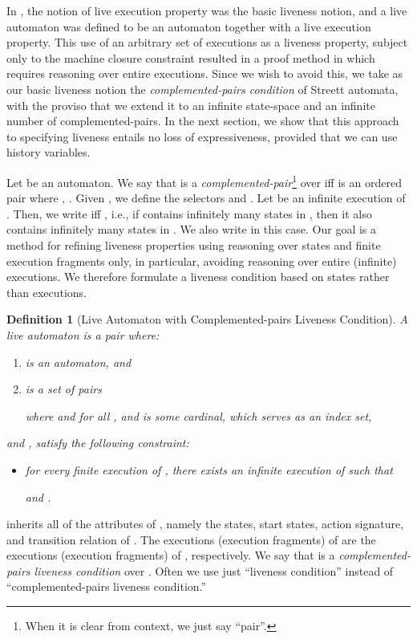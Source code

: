 \documentclass[11pt]{article}
\newcommand{\be}{\begin{itemize}}
\newcommand{\ee}{\end{itemize}}
\newcommand{\bn}{\begin{enumerate}}
\newcommand{\en}{\end{enumerate}}
\newcommand{\bd}{\begin{definition}}
\newcommand{\ed}{\end{definition}}
\newcommand{\intrdef}{\emph}	\newcommand{\intr}{\emph}
\newtheorem{definition}{Definition}
\begin{document}
In \cite{GSSL93,GSSL98}, the notion of live execution property was the
basic liveness notion, and a live automaton was defined to be an
automaton  together with a live execution property.
This use of an arbitrary set of executions as a liveness property,
subject only to the machine closure constraint resulted in a proof
method in \cite{GSSL93} which requires reasoning over entire
executions. Since we wish to avoid this, we take as our basic liveness
notion the \intr{complemented-pairs condition} of Streett automata,
with the proviso that we extend it to an infinite state-space and an
infinite number of complemented-pairs.
In the next section, we show that this approach to specifying liveness
entails no loss of expressiveness, provided that we can use history
variables.



Let  be an automaton. We say that  is a
\intrdef{complemented-pair}\footnote{When it is clear from context, we just
say ``pair''.} over  iff  is an ordered pair
 where , .
Given , we define the selectors  and . 
Let  be an infinite execution of . Then, we write
 iff ,
i.e., if  contains infinitely many states
in , then it also contains infinitely many states in
.
We also write 
 in this case. Our goal is a method for refining liveness properties using reasoning
over states and finite execution fragments only, in particular,
avoiding reasoning over entire (infinite) executions. We therefore formulate a
liveness condition based on states rather than executions.


\bd[Live Automaton with Complemented-pairs Liveness Condition] 
\label{def:live-automaton}
A \intrdef{live automaton} is a pair  where:
\bn

\item  is an automaton, and

\item  is a set of pairs

where  and  for
all , and  is some cardinal, which serves as an
index set,

\en

and ,  satisfy the following constraint:

\be
\item for every finite execution  of , there exists an infinite
execution  of  such that

 and .

\ee
\ed
 inherits all of the attributes of , namely the states,
start states, action signature, and transition relation of . 
The executions (execution fragments) of  are the executions
(execution fragments) of , respectively. 
We say that  is a \emph{complemented-pairs liveness condition} over .
Often we use just ``liveness condition'' instead of 
``complemented-pairs liveness condition.''
\end{document}
